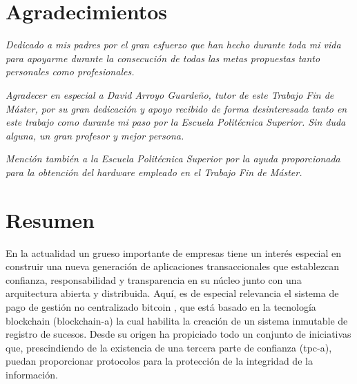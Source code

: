\documentclass[12pt,a4paper, twoside]{report}
\newcommand{\blankpage}{
				\newpage
				\thispagestyle{empty}
				\mbox{}
				\newpage
				}
\begin{document}
	\chapter*{Agradecimientos}
	\thispagestyle{empty}
	\vspace{1cm}
	\begin{flushright}
			\textit{Dedicado a mis padres por el gran esfuerzo que han hecho durante toda mi vida para apoyarme durante la consecución de todas las metas propuestas tanto personales como profesionales.} 
			
		\vspace{1cm}	
		
			\textit{Agradecer en especial a David Arroyo Guardeño, tutor de este Trabajo Fin de Máster, por su gran dedicación y apoyo recibido de forma desinteresada tanto en este trabajo como durante mi paso por la Escuela Politécnica Superior. Sin duda alguna, un gran profesor y mejor persona.}
			
		\vspace{1cm}	
		
		\textit{Mención también a la Escuela Politécnica Superior por la ayuda proporcionada para la obtención del hardware empleado en el Trabajo Fin de Máster.}
	\end{flushright}
	
	\blankpage
	
	\chapter*{Resumen}
	\thispagestyle{empty}
	
	\vspace{-0.3cm}
	
	En la actualidad un grueso importante de empresas tiene un interés especial en construir una nueva generación de aplicaciones transaccionales que establezcan confianza, responsabilidad y transparencia en su núcleo junto con una arquitectura abierta y distribuida. Aquí, es de especial relevancia el sistema de pago de gestión no centralizado \gls{bitcoin} \cite{bitcoin}, que está basado en la tecnología \Gls{blockchain} (\gls{blockchain-a}) \cite{iansiti:2017:ttab} la cual habilita la creación de un sistema inmutable de registro de sucesos. Desde su origen ha propiciado todo un conjunto de iniciativas que, prescindiendo de la existencia de una tercera parte de confianza (\gls{tpc-a}), puedan proporcionar protocolos para la protección de la integridad de la información. \\
	
\end{document}
